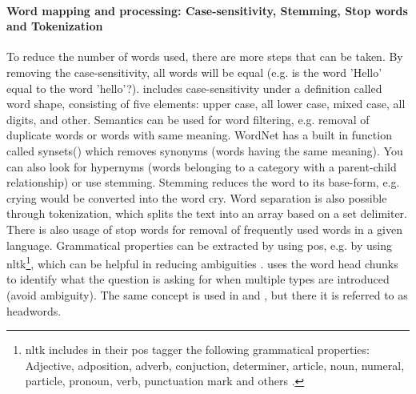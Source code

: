\paragraph{Word mapping and processing: Case-sensitivity, Stemming, Stop words and Tokenization}
\label{sec:word_mapping_processing}
To reduce the number of words used, there are more steps that can be taken. 
By removing the case-sensitivity, all words will be equal (e.g. is the word 'Hello' equal to the word 'hello'?).
\cite{Huang2008} includes case-sensitivity under a definition called word shape, consisting of five elements: upper case, all lower case, mixed case, all digits, and other.
\vspace{0.5em}\newline
Semantics can be used for word filtering, e.g. removal of duplicate words or words with same meaning. 
WordNet has a built in function called synsets() which removes synonyms (words having the same meaning). 
You can also look for hypernyms (words belonging to a category with a parent-child relationship) or use stemming.
Stemming reduces the word to its base-form, e.g. crying would be converted into the word cry.
Word separation is also possible through tokenization, which splits the text into an array based on a set delimiter.
There is also usage of stop words for removal of frequently used words in a given language.
\vspace{0.5em}\newline
Grammatical properties can be extracted by using \gls{pos}, e.g. by using \gls{nltk}\footnote{
	\gls{nltk} includes in their \gls{pos} tagger the following grammatical properties:
	Adjective, adposition, adverb, conjuction, determiner, article, noun, numeral, particle, pronoun, verb, 
	punctuation mark and others	 \cite[See Section 2.3]{StevenBird2015}.
}, which can be helpful in reducing ambiguities \cite{Bloehdorn2004}.
\textcite{Li} uses the word head chunks to identify what the question is asking for when multiple types are introduced (avoid ambiguity). 
The same concept is used in \cite{Huang2008} and \cite{Loni2011}, but there it is referred to as headwords.

